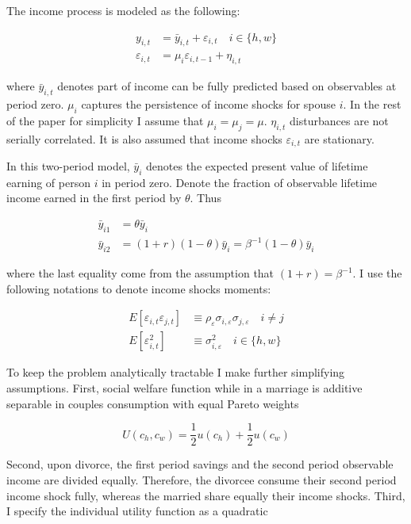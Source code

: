 The income process is modeled as the following:

\begin{align*}
y_{i,t} &= \bar y_{i,t} + \varepsilon_{i,t} \quad i \in \{h,w\} \\
\varepsilon_{i,t} & = \mu_i \varepsilon_{i, t-1} + \eta_{i,t}
\end{align*}


where $\bar y_{i,t}$ denotes part of income can be fully predicted based on observables at period zero.  $\mu_i$ captures the persistence of income shocks for spouse $i$. In the rest of the paper for simplicity I assume that \(\mu_i = \mu_j=\mu\).  \( \eta_{i,t} \) disturbances are not serially correlated. It is also assumed that income shocks $\varepsilon_{i,t}$ are stationary. 

In this two-period model, $\bar y_i$ denotes the expected present value of lifetime earning of person $i$ in period zero. Denote the fraction of observable lifetime income earned in the first period by $\theta$. Thus

\begin{align*}
\bar y_{i1} &= \theta \bar y_{i} \\
\bar y_{i2} &=  (1+r) (1 - \theta) \bar y_{i} = \beta^{-1} (1 - \theta) \bar y_{i} 
\end{align*}

\noindent where the last equality come from the assumption that \((1+r) = \beta^{-1}\). I use the following notations to denote income shocks moments:

\begin{align*}
E[\varepsilon_{i,t}  \varepsilon_{j,t}] &\equiv \rho_\varepsilon \sigma_{i,\varepsilon} \sigma_{j,\varepsilon}  \quad i \neq j\\
E[\varepsilon_{i,t}^2] &\equiv \sigma^2_{i,\varepsilon} \quad i \in \{h,w\}
\end{align*}

To keep the problem analytically tractable I make further simplifying assumptions. First, social welfare function while in a marriage is additive separable in couples consumption with equal Pareto weights

\begin{equation*}
U(c_h, c_w) = \dfrac{1}{2}u(c_h) + \dfrac{1}{2}u(c_w)
\end{equation*}

Second, upon divorce, the first period savings and the second period observable income are divided equally. Therefore, the divorcee consume their second period income shock fully, whereas the married share equally their income shocks. Third, I specify the individual utility function as a quadratic 

